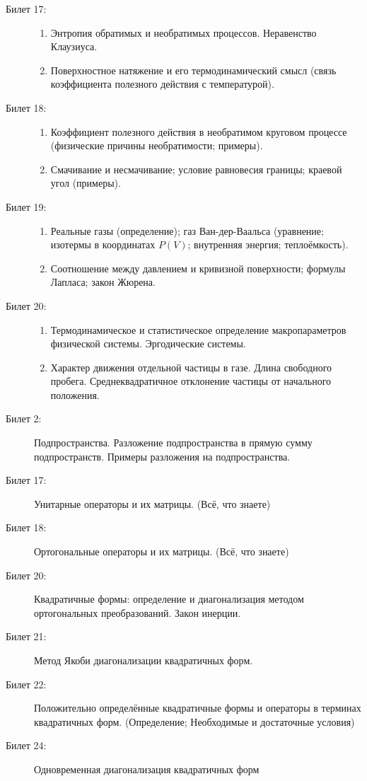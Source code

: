 \documentclass{article}
\makeatletter
\renewcommand{\subsection}{\@startsection{subsection}{2}{0pt}{1em}{1em}{\Large\bf}}
\makeatother
\begin{document}
\begin{description}
\begin{enumerate}
	\end{enumerate}
	\item[Билет 17:]\phantom{}
	\begin{enumerate}
		\item Энтропия обратимых и необратимых процессов.
		Неравенство Клаузиуса.
		\item Поверхностное натяжение и его термодинамический смысл
		(связь коэффициента полезного действия с температурой).
	\end{enumerate}
	\item[Билет 18:]\phantom{}
	\begin{enumerate}
		\item Коэффициент полезного действия в необратимом круговом процессе
		(физические причины необратимости; примеры).
		\item Смачивание и несмачивание; условие равновесия границы;
		краевой угол (примеры).
	\end{enumerate}
	\item[Билет 19:]\phantom{}
	\begin{enumerate}
		\item Реальные газы (определение); газ Ван-дер-Ваальса
		(уравнение; изотермы в координатах $P(V)$; внутренняя энергия;
		теплоёмкость).
		\item Соотношение между давлением и кривизной поверхности;
		формулы Лапласа; закон Жюрена.
	\end{enumerate}
	\item[Билет 20:]\phantom{}
	\begin{enumerate}
		\item Термодинамическое и статистическое определение
		макропараметров физической системы. Эргодические системы.
		\item Характер движения отдельной частицы в газе.
		Длина свободного пробега. Среднеквадратичное отклонение
		частицы от начального положения.
	\end{enumerate}
\end{description}
\subsection{Линейная алгебра}
\begin{description}
	\item[Билет 2:]
		Подпространства. Разложение подпространства в прямую сумму
		подпространств. Примеры разложения на подпространства.
	\item[Билет 17:]
		Унитарные операторы и их матрицы.
		(Всё, что знаете)
	\item[Билет 18:]
		Ортогональные операторы и их матрицы.
		(Всё, что знаете)
	\item[Билет 20:]
		Квадратичные формы: определение и диагонализация
		методом ортогональных преобразований. Закон инерции.
	\item[Билет 21:]
		Метод Якоби диагонализации квадратичных форм.
	\item[Билет 22:]
		Положительно определённые квадратичные формы
		и операторы в терминах квадратичных форм.
		(Определение; Необходимые и достаточные условия)
	\item[Билет 24:]
		Одновременная диагонализация квадратичных форм
\end{description}
\end{document}

